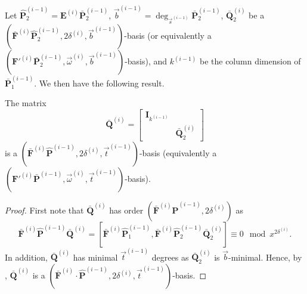 Let $\hat{\mathbf{P}}_{2}^{\left(i-1\right)}=\mathbf{E}^{\left(i\right)}\bar{\mathbf{P}}_{2}^{\left(i-1\right)}$,
$\vec{b}^{\left(i-1\right)}=\deg_{\vec{s}^{\left(i-1\right)}}\bar{\mathbf{P}}_{2}^{\left(i-1\right)}$,
$\bar{\mathbf{Q}}_{2}^{\left(i\right)}$ be a $(\bar{\mathbf{F}}^{\left(i\right)}\hat{\mathbf{P}}_{2}^{\left(i-1\right)},2\delta^{\left(i\right)},\vec{b}^{\left(i-1\right)})$-basis
(or equivalently a $(\mathbf{F}'^{\left(i\right)}\bar{\mathbf{P}}_{2}^{\left(i-1\right)},\vec{\omega}^{\left(i\right)},\vec{b}^{\left(i-1\right)})$-basis),
and $k^{\left(i-1\right)}$ be the column dimension of $\bar{\mathbf{P}}_{1}^{\left(i-1\right)}$.
We then have the following result. 
\begin{lem}
\label{lem:disregardComputedBasisElements} The matrix 
\[
\bar{\mathbf{Q}}^{\left(i\right)}=\left[\begin{array}{cc}
\mathbf{I}_{k^{\left(i-1\right)}}\\
 & \bar{\mathbf{Q}}_{2}^{\left(i\right)}
\end{array}\right]
\]
 is a $(\bar{\mathbf{F}}^{\left(i\right)}\hat{\mathbf{P}}^{\left(i-1\right)},2\delta^{\left(i\right)},\vec{t}^{\left(i-1\right)})$-basis
(equivalently a $(\mathbf{F}'^{\left(i\right)}\bar{\mathbf{P}}^{\left(i-1\right)},\vec{\omega}^{\left(i\right)},\vec{t}^{\left(i-1\right)})$-basis).\end{lem}
\begin{proof}
First note that $\bar{\mathbf{Q}}^{\left(i\right)}$ has order $(\bar{\mathbf{F}}^{\left(i\right)}\hat{\mathbf{P}}^{\left(i-1\right)},2\delta^{\left(i\right)})$
as 
\[
\bar{\mathbf{F}}^{\left(i\right)}\hat{\mathbf{P}}^{\left(i-1\right)}\bar{\mathbf{Q}}^{\left(i\right)}=[\bar{\mathbf{F}}^{\left(i\right)}\hat{\mathbf{P}}_{1}^{\left(i-1\right)},\bar{\mathbf{F}}^{\left(i\right)}\hat{\mathbf{P}}_{2}^{\left(i-1\right)}\bar{\mathbf{Q}}_{2}^{\left(i\right)}]\equiv0\mod x^{2\delta^{\left(i\right)}}.
\]
 In addition, $\bar{\mathbf{Q}}^{\left(i\right)}$ has minimal $\vec{t}^{\left(i-1\right)}$
degrees as $\bar{\mathbf{Q}}_{2}^{\left(i\right)}$ is $\vec{b}$-minimal.
Hence, by , $\bar{\mathbf{Q}}^{\left(i\right)}$
is a $(\bar{\mathbf{F}}^{\left(i\right)}\cdot\hat{\mathbf{P}}^{\left(i-1\right)},2\delta^{\left(i\right)},\vec{t}^{\left(i-1\right)})$-basis. 
\end{proof}
\begin{comment}
Alternatively, one can also argue that since $\hat{\mathbf{P}}_{1}^{\left(i-1\right)}$
already has order $(\bar{\mathbf{F}}^{\left(i\right)},2\delta^{\left(i\right)})$,
it cannot contribute in any way to and cannot be affected in any way
by the computations of a $(\bar{\mathbf{F}}^{\left(i\right)}\hat{\mathbf{P}}^{\left(i-1\right)},2\delta^{\left(i\right)},\vec{b}^{\left(i-1\right)})$-basis,
hence it is sufficient to just use $\bar{\mathbf{F}}^{\left(i\right)}\hat{\mathbf{P}}_{2}^{\left(i-1\right)}$
to compute a $(\bar{\mathbf{F}}^{\left(i\right)}\cdot\hat{\mathbf{P}}_{2}^{\left(i-1\right)},2\delta^{\left(i\right)},\vec{b}^{\left(i-1\right)})$-basis. 
\end{comment}


